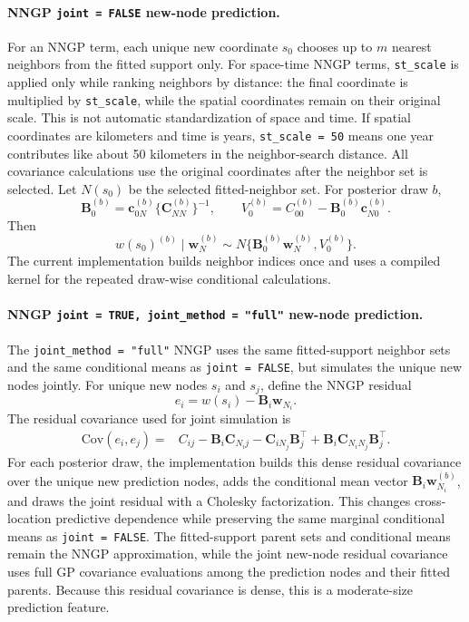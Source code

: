 \documentclass[11pt]{article}
\newcommand{\bw}{\bm{w}}
\newcommand{\bc}{\bm{c}}
\newcommand{\bB}{\bm{B}}
\newcommand{\bC}{\bm{C}}
\newcommand{\trans}{^\top}
\begin{document}
\paragraph{NNGP \texttt{joint = FALSE} new-node prediction.}
For an NNGP term, each unique new coordinate $s_0$ chooses up to $m$ nearest neighbors from the fitted support only. For space-time NNGP terms, \texttt{st\_scale} is applied only while ranking neighbors by distance: the final coordinate is multiplied by \texttt{st\_scale}, while the spatial coordinates remain on their original scale. This is not automatic standardization of space and time. If spatial coordinates are kilometers and time is years, \texttt{st\_scale = 50} means one year contributes like about 50 kilometers in the neighbor-search distance. All covariance calculations use the original coordinates after the neighbor set is selected. Let $N(s_0)$ be the selected fitted-neighbor set. For posterior draw $b$,
\begin{equation}
  \bB_0^{(b)} =
  \bc_{0N}^{(b)} \{\bC_{NN}^{(b)}\}^{-1},
  \qquad
  V_0^{(b)} =
  C_{00}^{(b)} - \bB_0^{(b)} \bc_{N0}^{(b)} .
\end{equation}
Then
\begin{equation}
  w(s_0)^{(b)} \mid \bw_N^{(b)}
  \sim N\{\bB_0^{(b)} \bw_N^{(b)}, V_0^{(b)}\}.
\end{equation}
The current implementation builds neighbor indices once and uses a compiled kernel for the repeated draw-wise conditional calculations.

\paragraph{NNGP \texttt{joint = TRUE, joint\_method = "full"} new-node prediction.}
The \texttt{joint\_method = "full"} NNGP uses the same fitted-support neighbor sets and the same conditional means as \texttt{joint = FALSE}, but simulates the unique new nodes jointly. For unique new nodes $s_i$ and $s_j$, define the NNGP residual
\begin{equation}
  e_i = w(s_i) - \bB_i \bw_{N_i}.
\end{equation}
The residual covariance used for joint simulation is
\begin{equation}
\begin{aligned}
  \mathrm{Cov}(e_i, e_j)
    ={}& C_{ij}
      - \bB_i \bC_{N_i j}
      - \bC_{i N_j}\bB_j\trans
      + \bB_i \bC_{N_i N_j} \bB_j\trans .
\end{aligned}
\end{equation}
For each posterior draw, the implementation builds this dense residual covariance over the unique new prediction nodes, adds the conditional mean vector $\bB_i \bw_{N_i}^{(b)}$, and draws the joint residual with a Cholesky factorization. This changes cross-location predictive dependence while preserving the same marginal conditional means as \texttt{joint = FALSE}. The fitted-support parent sets and conditional means remain the NNGP approximation, while the joint new-node residual covariance uses full GP covariance evaluations among the prediction nodes and their fitted parents. Because this residual covariance is dense, this is a moderate-size prediction feature.
\end{document}
